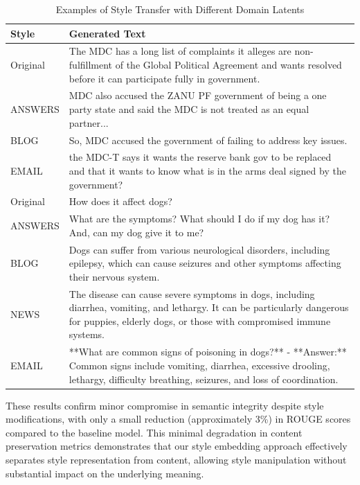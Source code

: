 \documentclass{article}
\begin{document}
\begin{table}
\centering
\caption{Examples of Style Transfer with Different Domain Latents}
\label{tab:style-transfer-examples}
\begin{tabular}{>{\raggedright\arraybackslash}p{1.5cm} >{\raggedright\arraybackslash}p{14cm}}
\hline
\textbf{Style} & \textbf{Generated Text} \\
\hline
Original & The MDC has a long list of complaints it alleges are non-fulfillment of the Global Political Agreement and wants resolved before it can participate fully in government. \\
\hline
ANSWERS & MDC also accused the ZANU PF government of being a one party state and said the MDC is not treated as an equal partner... \\
\hline
BLOG & So, MDC accused the government of failing to address key issues. \\
\hline
EMAIL & the MDC-T says it wants the reserve bank gov to be replaced and that it wants to know what is in the arms deal signed by the government? \\
\hline
\hline
Original & How does it affect dogs? \\
\hline
ANSWERS & What are the symptoms? What should I do if my dog has it? And, can my dog give it to me? \\
\hline
BLOG & Dogs can suffer from various neurological disorders, including epilepsy, which can cause seizures and other symptoms affecting their nervous system. \\
\hline
NEWS & The disease can cause severe symptoms in dogs, including diarrhea, vomiting, and lethargy. It can be particularly dangerous for puppies, elderly dogs, or those with compromised immune systems. \\
\hline
EMAIL & **What are common signs of poisoning in dogs?** - **Answer:** Common signs include vomiting, diarrhea, excessive drooling, lethargy, difficulty breathing, seizures, and loss of coordination. \\
\hline
\end{tabular}
\end{table}

These results confirm minor compromise in semantic integrity despite style modifications, with only a small reduction (approximately 3\%) in ROUGE scores compared to the baseline model. This minimal degradation in content preservation metrics demonstrates that our style embedding approach effectively separates style representation from content, allowing style manipulation without substantial impact on the underlying meaning.
\end{document}

